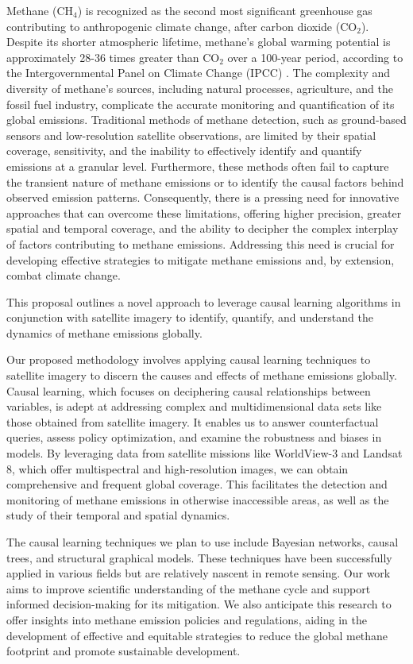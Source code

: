 Methane (CH$_4$) is recognized as the second most significant greenhouse gas contributing to anthropogenic climate change, after carbon dioxide (CO$_2$). Despite its shorter atmospheric lifetime, methane's global warming potential is approximately 28-36 times greater than CO$_2$ over a 100-year period, according to the Intergovernmental Panel on Climate Change (IPCC) \cite{IPCC2013}. The complexity and diversity of methane's sources, including natural processes, agriculture, and the fossil fuel industry, complicate the accurate monitoring and quantification of its global emissions. Traditional methods of methane detection, such as ground-based sensors and low-resolution satellite observations, are limited by their spatial coverage, sensitivity, and the inability to effectively identify and quantify emissions at a granular level. Furthermore, these methods often fail to capture the transient nature of methane emissions or to identify the causal factors behind observed emission patterns. Consequently, there is a pressing need for innovative approaches that can overcome these limitations, offering higher precision, greater spatial and temporal coverage, and the ability to decipher the complex interplay of factors contributing to methane emissions. Addressing this need is crucial for developing effective strategies to mitigate methane emissions and, by extension, combat climate change.


This proposal outlines a novel approach to leverage causal learning algorithms in conjunction with satellite imagery to identify, quantify, and understand the dynamics of methane emissions globally.


Our proposed methodology involves applying causal learning techniques to satellite imagery to discern the causes and effects of methane emissions globally. Causal learning, which focuses on deciphering causal relationships between variables, is adept at addressing complex and multidimensional data sets like those obtained from satellite imagery. It enables us to answer counterfactual queries, assess policy optimization, and examine the robustness and biases in models. By leveraging data from satellite missions like WorldView-3 and Landsat 8, which offer multispectral and high-resolution images, we can obtain comprehensive and frequent global coverage. This facilitates the detection and monitoring of methane emissions in otherwise inaccessible areas, as well as the study of their temporal and spatial dynamics.

The causal learning techniques we plan to use include Bayesian networks, causal trees, and structural graphical models. These techniques have been successfully applied in various fields but are relatively nascent in remote sensing. Our work aims to improve scientific understanding of the methane cycle and support informed decision-making for its mitigation. We also anticipate this research to offer insights into methane emission policies and regulations, aiding in the development of effective and equitable strategies to reduce the global methane footprint and promote sustainable development.

